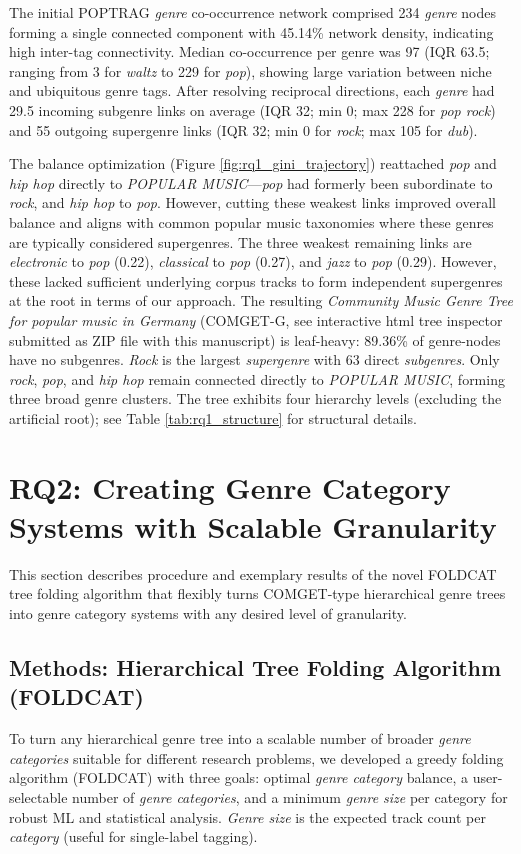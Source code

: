 \documentclass{article}
\begin{document}
The initial POPTRAG \textit{genre} co-occurrence network comprised 234 \textit{genre} nodes forming a single connected component with 45.14\% network density, indicating high inter-tag connectivity. Median co-occurrence per genre was 97 (IQR 63.5; ranging from 3 for \textit{waltz} to 229 for \textit{pop}), showing large variation between niche and ubiquitous genre tags. After resolving reciprocal directions, each \textit{genre} had 29.5 incoming subgenre links on average (IQR 32; min 0; max 228 for \textit{pop rock}) and 55 outgoing supergenre links (IQR 32; min 0 for \textit{rock}; max 105 for \textit{dub}). 

The balance optimization (Figure \ref{fig:rq1_gini_trajectory}) reattached \textit{pop} and \textit{hip hop} directly to \textit{POPULAR MUSIC}—\textit{pop} had formerly been subordinate to \textit{rock}, and \textit{hip hop} to \textit{pop}. However, cutting these weakest links improved overall balance and aligns with common popular music taxonomies where these genres are typically considered supergenres.  The three weakest remaining links are \textit{electronic} to \textit{pop} (0.22), \textit{classical} to \textit{pop} (0.27), and \textit{jazz} to \textit{pop} (0.29). However, these lacked sufficient underlying corpus tracks to form independent supergenres at the root in terms of our approach. The resulting \textit{Community Music Genre Tree for popular music in Germany} (COMGET-G, see interactive html tree inspector submitted as ZIP file  with this manuscript) is leaf-heavy: 89.36\% of genre-nodes have no subgenres. \textit{Rock} is the largest \textit{supergenre} with 63 direct \textit{subgenres}. Only \textit{rock}, \textit{pop}, and \textit{hip hop} remain connected directly to \textit{POPULAR MUSIC}, forming three broad genre clusters. The tree exhibits four hierarchy levels (excluding the artificial root); see Table \ref{tab:rq1_structure} for structural details.  


\section{RQ2: Creating Genre Category Systems with Scalable Granularity}

This section describes procedure and exemplary results of the novel FOLDCAT tree folding algorithm that flexibly turns COMGET-type hierarchical genre trees into genre category systems with any desired level of granularity.

\subsection{Methods: Hierarchical Tree Folding Algorithm (FOLDCAT)}
To turn any hierarchical genre tree into a scalable number of broader \textit{genre categories} suitable for different research problems,  we developed a greedy folding algorithm (FOLDCAT) with three goals: optimal \textit{genre category} balance, a user-selectable number of \textit{genre categories}, and a minimum \textit{genre size} per category for robust ML and statistical analysis. \textit{Genre size} is the expected track count per \textit{category} (useful for single-label tagging).
\end{document}
